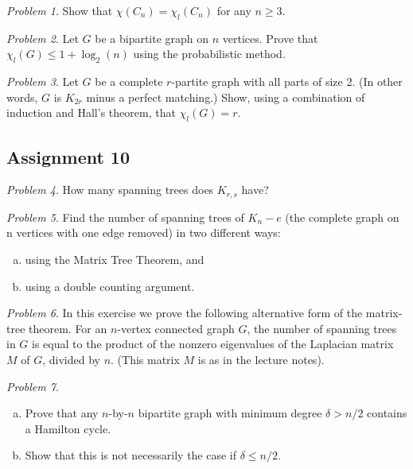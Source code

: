 \documentclass[10pt, fleqn, a4paper, landscape]{article}
\theoremstyle{plain} %
\theoremstyle{remark} %
\newtheorem{problem}{Problem}
\theoremstyle{definition} %
\begin{document}
\begin{multicols}{3}
\begin{tiny}
\begin{problem}
Show that $\chi(C_n) = \chi_l(C_n)$ for any $n \ge 3$.
\end{problem}

\begin{problem}
Let $G$ be a bipartite graph on $n$ vertices. Prove that $\chi_l(G)\le 1 + \log_2(n)$ using the probabilistic method.
\end{problem}

\begin{problem}
Let $G$ be a complete $r$-partite graph with all parts of size 2. (In other words, $G$ is $K_{2r}$ minus a perfect matching.) Show, using a combination of induction and Hall's theorem, that $\chi_l(G) = r$.
\end{problem}

\subsection{Assignment 10}

\begin{problem}
How many spanning trees does $K_{r,s}$ have?
\end{problem}

\begin{problem}
Find the number of spanning trees of $K_n- e$ (the complete graph on n vertices with one edge removed) in two different ways:
\begin{enumerate}[(a)]
\item using the Matrix Tree Theorem, and 
\item using a double counting argument.
\end{enumerate} 
\end{problem}

\begin{problem}
In this exercise we prove the following alternative form of the matrix-tree theorem. For an $n$-vertex connected graph $G$, the number of spanning trees in $G$ is equal to the product of the  nonzero eigenvalues of the Laplacian matrix $M$ of $G$, divided by $n$. (This matrix $M$ is as in the lecture notes).
\end{problem}

\begin{problem}
\begin{enumerate}[(a)]
\item Prove that any $n$-by-$n$ bipartite graph with minimum degree $\delta > n/2$ contains a Hamilton cycle.
\item  Show that this is not necessarily the case if $\delta\le n/2$.
\end{enumerate}
\end{problem}


\end{tiny}
\end{multicols}
\end{document}
